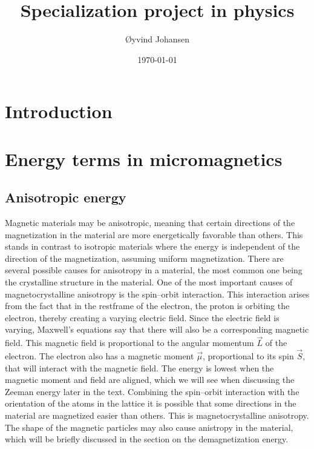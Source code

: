 \documentclass[1p]{elsarticle}		%
\begin{document}
\begin{frontmatter}

\title{Specialization project in physics}
\author{\O yvind Johansen}
\date{\today}

\begin{abstract}

\end{abstract}

\end{frontmatter}

\section{Introduction}

\section{Energy terms in micromagnetics}
\subsection{Anisotropic energy}
Magnetic materials may be anisotropic, meaning that certain directions of the magnetization in the material are more energetically favorable than others. This stands in contrast to isotropic materials where the energy is independent of the direction of the magnetization, assuming uniform magnetization. There are several possible causes for anisotropy in a material, the most common one being the crystalline structure in the material. One of the most important causes of magnetocrystalline anisotropy is the spin--orbit interaction. This interaction arises from the fact that in the restframe of the electron, the proton is orbiting the electron, thereby creating a varying electric field. Since the electric field is varying, Maxwell's equations say that there will also be a corresponding magnetic field. This magnetic field is proportional to the angular momentum $\vec{L}$ of the electron. The electron also has a magnetic moment $\vec{\mu}$, proportional to its spin $\vec{S}$, that will interact with the magnetic field. The energy is lowest when the magnetic moment and field are aligned, which we will see when discussing the Zeeman energy later in the text. Combining the spin--orbit interaction with the orientation of the atoms in the lattice it is possible that some directions in the material are magnetized easier than others. This is magnetocrystalline anisotropy. The shape of the magnetic particles may also cause anistropy in the material, which will be briefly discussed in the section on the demagnetization energy. 
\end{document}
